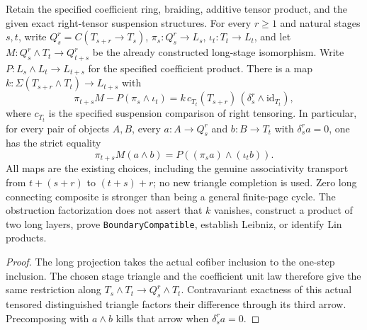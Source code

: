 \begin{proposition}
  \label{prop:h6-long-stage-projection-comparison}
  \leanok
  Retain the specified coefficient ring, braiding, additive tensor product,
  and the given exact right-tensor suspension structures. For every
  $r\ge1$ and natural stages $s,t$, write $Q_s^r=C(T_{s+r}\to T_s)$,
  $\pi_s:Q_s^r\to L_s$, $\iota_t:T_t\to L_t$, and let
  $M:Q_s^r\wedge T_t\to Q_{t+s}^r$ be the already constructed
  long-stage isomorphism. Write $P:L_s\wedge L_t\to L_{t+s}$ for the
  specified coefficient product. There is a map
  $k:\Sigma(T_{s+r}\wedge T_t)\to L_{t+s}$ with
  \[
    \pi_{t+s}M-P(\pi_s\wedge\iota_t)
      =k\,c_{T_t}(T_{s+r})\,(\delta_s^r\wedge\mathrm{id}_{T_t}),
  \]
  where $c_{T_t}$ is the specified suspension comparison of right tensoring.
  In particular, for every pair of objects $A,B$, every $a:A\to Q_s^r$
  and $b:B\to T_t$ with $\delta_s^ra=0$, one has the strict equality
  \[
    \pi_{t+s}M(a\wedge b)=P((\pi_sa)\wedge(\iota_tb)).
  \]
  All maps are the existing choices, including the genuine associativity
  transport from $t+(s+r)$ to $(t+s)+r$; no new triangle completion is used.
  Zero long connecting composite is stronger than being a general
  finite-page cycle. The obstruction factorization does not assert that
  $k$ vanishes, construct a product of two long layers, prove
  \texttt{BoundaryCompatible}, establish Leibniz, or identify Lin products.
\end{proposition}
\begin{proof}
  The long projection takes the actual cofiber inclusion to the one-step
  inclusion. The chosen stage triangle and the coefficient unit law therefore
  give the same restriction along $T_s\wedge T_t\to Q_s^r\wedge T_t$.
  Contravariant exactness of this actual tensored distinguished triangle
  factors their difference through its third arrow. Precomposing with
  $a\wedge b$ kills that arrow when $\delta_s^ra=0$.
  \leanok
\end{proof}

